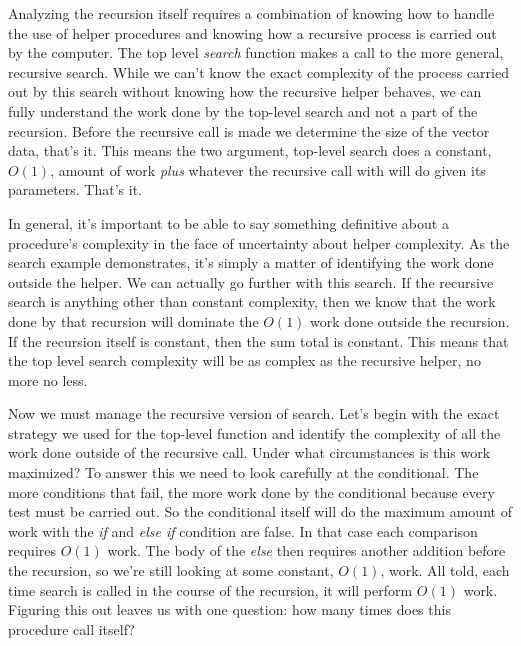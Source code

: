 \documentclass[]{tufte-handout}
\begin{document}
Analyzing the recursion itself requires a combination of knowing how to handle the use of helper procedures and knowing how a recursive process is carried out by the computer. The top level \textit{search} function makes a call to the more general, recursive search.  While we can't know the exact complexity of the process carried out by this search without knowing how the recursive helper behaves, we can fully understand the work done by the top-level search and not a part of the recursion. Before the recursive call is made we determine the size of the vector data, that's it. This means the two argument, top-level search does a constant, $O(1)$, amount of work \textit{plus} whatever the recursive call with will do given its parameters. That's it.  

In general, it's important to be able to say something definitive about a procedure's complexity in the face of uncertainty about helper complexity. As the search example demonstrates, it's simply a matter of identifying the work done outside the helper. We can actually go further with this search. If the recursive search is anything other than constant complexity, then we know that the work done by that recursion will dominate the $O(1)$ work done outside the recursion. If the recursion itself is constant, then the sum total is constant. This means that the top level search complexity will be as complex as the recursive helper, no more no less.

Now we must manage the recursive version of search. Let's begin with the exact strategy we used for the top-level function and identify the complexity of all the work done outside of the recursive call. Under what circumstances is this work maximized? To answer this we need to look carefully at the conditional. The more conditions that fail, the more work done by the conditional because every test must be carried out.  So the conditional itself will do the maximum amount of work with the \textit{if} and \textit{else if} condition are false. In that case each comparison requires $O(1)$ work. The body of the \textit{else} then requires another addition before the recursion, so we're still looking at some constant, $O(1)$, work. All told, each time search is called in the course of the recursion, it will perform $O(1)$ work.  Figuring this out leaves us with one question: how many times does this procedure call itself?
\end{document}
